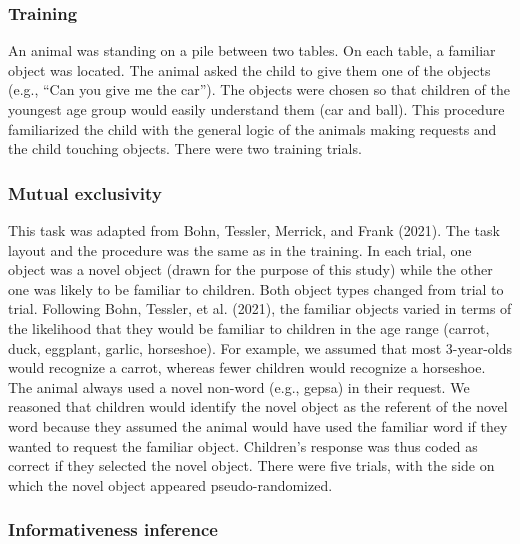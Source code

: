 \documentclass[
  man,floatsintext]{apa6}
\begin{document}
\hypertarget{training}{%
\subsubsection{Training}\label{training}}

An animal was standing on a pile between two tables. On each table, a familiar object was located. The animal asked the child to give them one of the objects (e.g., ``Can you give me the car''). The objects were chosen so that children of the youngest age group would easily understand them (car and ball). This procedure familiarized the child with the general logic of the animals making requests and the child touching objects. There were two training trials.

\hypertarget{mutual-exclusivity}{%
\subsubsection{Mutual exclusivity}\label{mutual-exclusivity}}

This task was adapted from Bohn, Tessler, Merrick, and Frank (2021). The task layout and the procedure was the same as in the training. In each trial, one object was a novel object (drawn for the purpose of this study) while the other one was likely to be familiar to children. Both object types changed from trial to trial. Following Bohn, Tessler, et al. (2021), the familiar objects varied in terms of the likelihood that they would be familiar to children in the age range (carrot, duck, eggplant, garlic, horseshoe). For example, we assumed that most 3-year-olds would recognize a carrot, whereas fewer children would recognize a horseshoe. The animal always used a novel non-word (e.g., gepsa) in their request. We reasoned that children would identify the novel object as the referent of the novel word because they assumed the animal would have used the familiar word if they wanted to request the familiar object. Children's response was thus coded as correct if they selected the novel object. There were five trials, with the side on which the novel object appeared pseudo-randomized.

\hypertarget{informativeness-inference}{%
\subsubsection{Informativeness inference}\label{informativeness-inference}}
\end{document}
